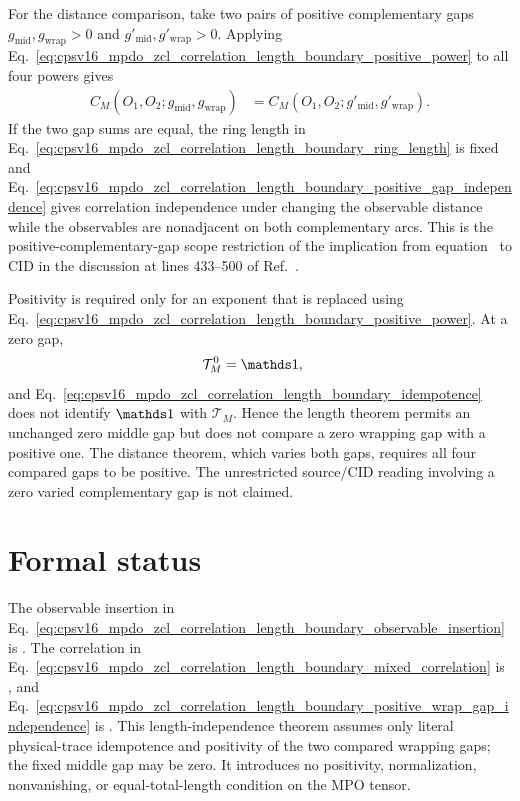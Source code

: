 \documentclass{article}
\begin{document}
For the distance comparison, take two pairs of positive complementary gaps
$g_{\mathrm{mid}},g_{\mathrm{wrap}}>0$ and
$g'_{\mathrm{mid}},g'_{\mathrm{wrap}}>0$. Applying
Eq.~\ref{eq:cpsv16_mpdo_zcl_correlation_length_boundary_positive_power} to
all four powers gives
\begin{align}
    C_M(O_1,O_2;g_{\mathrm{mid}},g_{\mathrm{wrap}})
        &=C_M(O_1,O_2;g'_{\mathrm{mid}},g'_{\mathrm{wrap}}).
    \label{eq:cpsv16_mpdo_zcl_correlation_length_boundary_positive_gap_independence}
\end{align}
If the two gap sums are equal, the ring length in
Eq.~\ref{eq:cpsv16_mpdo_zcl_correlation_length_boundary_ring_length} is fixed
and
Eq.~\ref{eq:cpsv16_mpdo_zcl_correlation_length_boundary_positive_gap_independence}
gives correlation independence under changing the observable distance while
the observables are nonadjacent on both complementary arcs. This is the
positive-complementary-gap scope restriction of the implication from
equation~ to CID in the discussion at lines 433--500 of
Ref.~\cite{Cirac2016MPDO_arXiv}.

Positivity is required only for an exponent that is replaced using
Eq.~\ref{eq:cpsv16_mpdo_zcl_correlation_length_boundary_positive_power}. At a
zero gap,
\begin{align}
    \mathcal T_M^0
        &=\Id,
    \label{eq:cpsv16_mpdo_zcl_correlation_length_boundary_zero_power}
\end{align}
and
Eq.~\ref{eq:cpsv16_mpdo_zcl_correlation_length_boundary_idempotence} does not
identify $\Id$ with $\mathcal T_M$. Hence the length theorem permits an
unchanged zero middle gap but does not compare a zero wrapping gap with a
positive one. The distance theorem, which varies both gaps, requires all four
compared gaps to be positive. The unrestricted source/CID reading involving a
zero varied complementary gap is not claimed.

\section{Formal status}

The observable insertion in
Eq.~\ref{eq:cpsv16_mpdo_zcl_correlation_length_boundary_observable_insertion}
is . The correlation in
Eq.~\ref{eq:cpsv16_mpdo_zcl_correlation_length_boundary_mixed_correlation}
is , and
Eq.~\ref{eq:cpsv16_mpdo_zcl_correlation_length_boundary_positive_wrap_gap_independence}
is
.
This length-independence theorem assumes only literal physical-trace
idempotence and positivity of the two compared wrapping gaps; the fixed middle
gap may be zero. It introduces no positivity, normalization, nonvanishing, or
equal-total-length condition on the MPO tensor.
\end{document}
